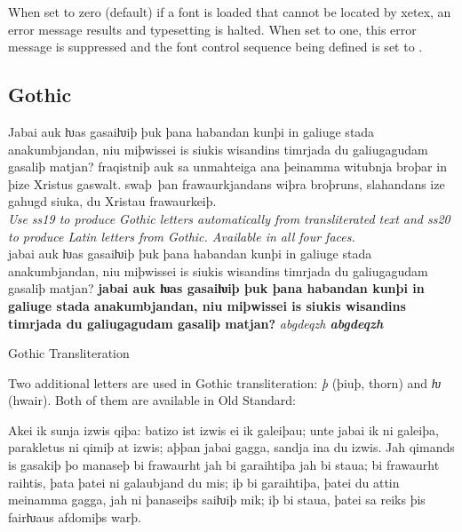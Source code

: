 {
\noindent\color{thered}\cmd{\suppressfontnotfounderror}
}

\noindent When set to zero (default) if a font is loaded that cannot be
located by xetex, an error message results and typesetting is
halted. When set to one, this error message is
suppressed and the font control sequence being defined is set to
.

\begin{comment}
\begin{texexample}{supress errors}{err}
\end{texexample}
\end{comment}


\subsection*{Gothic}

Jabai auk ƕas gasaiƕiþ þuk þana habandan kunþi in galiuge stada
anakumbjandan, niu miþwissei is siukis wis\-an\-dins timrjada du
galiugagudam gasaliþ matjan?  fraqistniþ auk sa unmahteiga ana
þeinamma witubnja broþar in þize Xristus gaswalt.  swaþ~þan
frawaurkjandans wiþra broþruns, slahandans ize gahugd siuka, du
Xristau fra\-waur\-keiþ.\\

{\noindent\small\itshape Use ss19 to produce Gothic letters
  automatically from transliterated text and ss20 to produce Latin
  letters from Gothic. Available in all four faces.}\\[1ex]
{jabai auk ƕas gasaiƕiþ þuk þana
  habandan kunþi in ga\-liuge stada anakumbjandan, niu miþwissei is
  siukis wis\-an\-dins timrjada du galiugagudam gasaliþ matjan?
  {\bfseries jabai auk ƕas gasaiƕiþ þuk þana habandan kunþi in
    ga\-liuge stada anakumbjandan, niu miþwissei is siukis
    wis\-an\-dins timrjada du galiugagudam gasaliþ matjan?}
  \textit{abgdeqzh \bfseries abgdeqzh}}

Gothic Transliteration

Two additional letters are used in Gothic transliteration: \textit{þ}
(þiuþ, thorn) and \textit{ƕ} (hwair). Both of them are available in Old
Standard:


\large

Akei ik sunja izwis qiþa: batizo ist izwis ei ik galeiþau; unte jabai ik ni
galeiþa, parakletus ni qimiþ at izwis; aþþan jabai gagga, sandja ina du
izwis. Jah qimands is gasakiþ þo manaseþ bi frawaurht jah bi garaihtiþa
jah bi staua; bi frawaurht raihtis, þata þatei ni galaubjand du mis; iþ bi
garaihtiþa, þatei du attin meinamma gagga, jah ni þanaseiþs saiƕiþ mik;
iþ bi staua, þatei sa reiks þis fairƕaus afdomiþs warþ.

